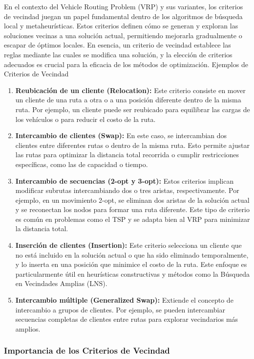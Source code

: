 \documentclass{article}
\begin{document}
En el contexto del Vehicle Routing Problem (VRP) y sus variantes, los criterios de vecindad juegan un papel fundamental dentro de los algoritmos de búsqueda local y metaheurísticas. Estos criterios definen cómo se generan y exploran las soluciones vecinas a una solución actual, permitiendo mejorarla gradualmente o escapar de óptimos locales. En esencia, un criterio de vecindad establece las reglas mediante las cuales se modifica una solución, y la elección de criterios adecuados es crucial para la eficacia de los métodos de optimización.
Ejemplos de Criterios de Vecindad
\begin{enumerate}
\item
    \textbf{Reubicación de un cliente (Relocation):}
    Este criterio consiste en mover un cliente de una ruta a otra o a una posición diferente dentro de la misma ruta. Por ejemplo, un cliente puede ser reubicado para equilibrar las cargas de los vehículos o para reducir el costo de la ruta.
\item
    \textbf{Intercambio de clientes (Swap):}
    En este caso, se intercambian dos clientes entre diferentes rutas o dentro de la misma ruta. Esto permite ajustar las rutas para optimizar la distancia total recorrida o cumplir restricciones específicas, como las de capacidad o tiempo.
\item
    \textbf{Intercambio de secuencias (2-opt y 3-opt):}
    Estos criterios implican modificar subrutas intercambiando dos o tres aristas, respectivamente. Por ejemplo, en un movimiento 2-opt, se eliminan dos aristas de la solución actual y se reconectan los nodos para formar una ruta diferente. Este tipo de criterio es común en problemas como el TSP y se adapta bien al VRP para minimizar la distancia total.
\item
    \textbf{Inserción de clientes (Insertion):}
    Este criterio selecciona un cliente que no está incluido en la solución actual o que ha sido eliminado temporalmente, y lo inserta en una posición que minimice el costo de la ruta. Este enfoque es particularmente útil en heurísticas constructivas y métodos como la Búsqueda en Vecindades Amplias (LNS).
\item
    \textbf{Intercambio múltiple (Generalized Swap):}
    Extiende el concepto de intercambio a grupos de clientes. Por ejemplo, se pueden intercambiar secuencias completas de clientes entre rutas para explorar vecindarios más amplios.
\end{enumerate}

\subsubsection{Importancia de los Criterios de Vecindad}
\end{document}
